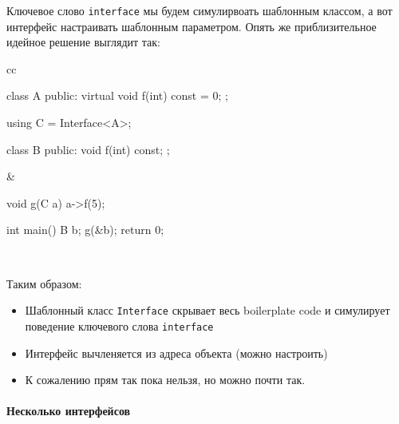 Ключевое слово \texttt{interface} мы будем симулирвоать шаблонным классом, а вот интерфейс настраивать шаблонным параметром.
Опять же приблизительное идейное решение выглядит так:
\begin{center}
\begin{tabular}{cc}
{
\begin{minipage}[\baselineskip]{6cm}
\begin{cppcode}[numbers = none]
class A {
public:
  virtual void f(int) const = 0;
};

using C = Interface<A>;

class B {
public:
   void f(int) const;
};
\end{cppcode}
\end{minipage}
}&{
\begin{minipage}[\baselineskip]{4cm}
\begin{cppcode}[numbers = none]

void g(C a) {
  a->f(5);
}

int main() {
  B b;
  g(&b);
  return 0;
}

\end{cppcode}
\end{minipage}
}\\
\end{tabular}
\end{center}
Таким образом:
\begin{itemize}
\item Шаблонный класс \texttt{Interface} скрывает весь boilerplate code и симулирует поведение ключевого слова \texttt{interface}

\item Интерфейс вычленяется из адреса объекта (можно настроить)

\item К сожалению прям так пока нельзя, но можно почти так.
\end{itemize}

\paragraph{Несколько интерфейсов}

